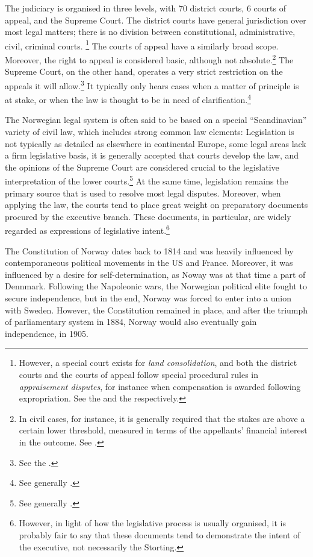 The judiciary is organised in three levels, with 70 district courts, 6 courts of appeal, and the Supreme Court. The district courts have general jurisdiction over most legal matters; there is no division between constitutional, administrative, civil, criminal courts. \footnote{However, a special court exists for {\it land consolidation}, and both the district courts and the courts of appeal follow special procedural rules in {\it appraisement disputes}, for instance when compensation is awarded following expropriation. See the \cite{lca79} and the \cite{aa17} respectively.} The courts of appeal have a similarly broad scope. Moreover, the right to appeal is considered basic, although not absolute.\footnote{In civil cases, for instance, it is generally required that the stakes are above a certain lower threshold, measured in terms of the appellants' financial interest in the outcome. See \cite[29-13]{da05}.}  The Supreme Court, on the other hand, operates a very strict restriction on the appeals it will allow.\footnote{See the \cite[30-4]{da05}.} It typically only hears cases when a matter of principle is at stake, or when the law is thought to be in need of clarification.\footnote{See generally \cite{skoghoy08}.}

The Norwegian legal system is often said to be based on a special ``Scandinavian'' variety of civil law, which includes strong common law elements: Legislation is not typically as detailed as elsewhere in continental Europe, some legal areas lack a firm legislative basis,  it is generally accepted that courts develop the law, and the opinions of the Supreme Court are considered crucial to the legislative interpretation of the lower courts.\footnote{See generally \cite{bernitz07}.} At the same time, legislation remains the primary source that is used to resolve most legal disputes. Moreover, when applying the law, the courts tend to place great weight on preparatory documents procured by the executive branch. These documents, in particular, are widely regarded as expressions of legislative intent.\footnote{However, in light of how the legislative process is usually organised, it is probably fair to say that these documents tend to demonstrate the intent of the executive, not necessarily the Storting.}

The Constitution of Norway dates back to 1814 and was heavily influenced by contemporaneous political movements in the US and France. Moreover, it was influenced by a desire for self-determination, as Noway was at that time a part of Dennmark. Following the Napoleonic wars, the Norwegian political elite fought to secure independence, but in the end, Norway was forced to enter into a union with Sweden. However, the Constitution remained in place, and after the triumph of parliamentary system in 1884, Norway would also eventually gain independence, in 1905.

